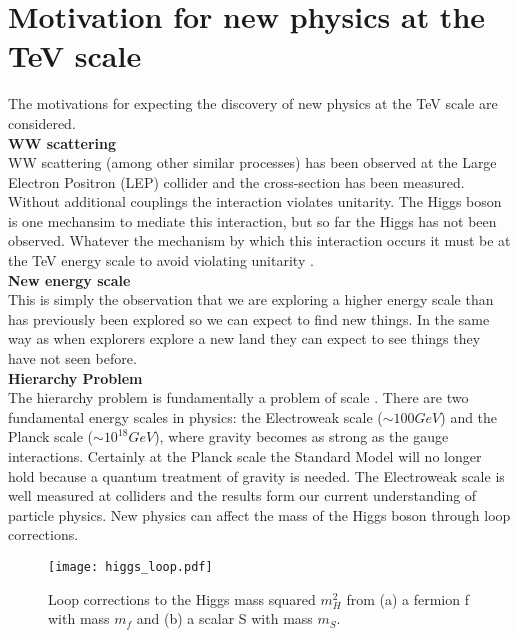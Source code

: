 \section{Motivation for new physics at the TeV scale}

The motivations for expecting the discovery of new physics at the TeV scale are
considered. \\

{\bf WW scattering} \\

WW scattering (among other similar processes) has been observed at the Large 
Electron Positron (LEP) collider and the cross-section has been measured. 
Without additional couplings the interaction violates unitarity. The Higgs boson 
is one mechansim to mediate this interaction, but so far the Higgs has not been 
observed. Whatever the mechanism by which this interaction occurs it must be at 
the TeV energy scale to avoid violating unitarity \cite{halzen_and_martin}. \\

{\bf New energy scale} \\

This is simply the observation that we are exploring a higher energy scale than
has previously been explored so we can expect to find new things. In the same
way as when explorers explore a new land they can expect to see things they
have not seen before. \\

{\bf Hierarchy Problem} \\

The hierarchy problem is fundamentally a problem of scale \cite{dvali}. There 
are two fundamental energy scales in physics: the Electroweak scale 
($\sim100\unit{GeV}$) and the Planck scale ($\sim10^{18}\unit{GeV}$), where 
gravity becomes as strong as the gauge interactions. Certainly at the Planck 
scale the Standard Model will no longer hold because a quantum treatment of 
gravity is needed. The Electroweak scale is well measured at colliders and the 
results form our current understanding of particle physics. New physics can
affect the mass of the Higgs boson through loop corrections. \\

\begin{figure}
\begin{center}
\texttt{[image: higgs\_loop.pdf]}
\end{center}
\caption{Loop corrections to the Higgs mass squared $m_{H}^{2}$ from (a) a 
fermion f with mass $m_{f}$ and (b) a scalar S with mass $m_{S}$.}
\label{fig:higgs_loop}
\end{figure}

